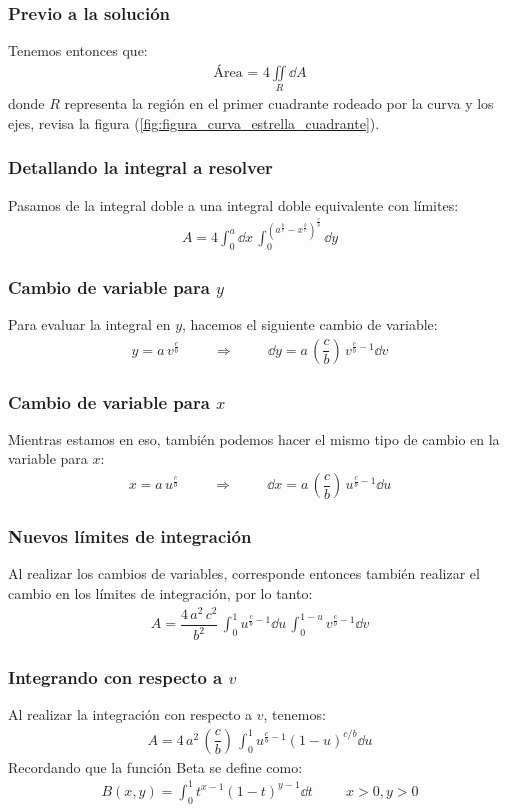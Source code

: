 \begin{frame}
\frametitle{Previo a la solución}
Tenemos entonces que:
\begin{align*}
\mbox{Área = } 4 \iint \limits_{R} \dd{A}
\end{align*}
donde $R$ representa la región en el primer cuadrante rodeado por la curva y los ejes, revisa la figura (\ref{fig:figura_curva_estrella_cuadrante}).
\end{frame}
\begin{frame}
\frametitle{Detallando la integral a resolver}
Pasamos de la integral doble a una integral doble equivalente con límites:
\begin{align*}
A = 4 \int_{0}^{a} \dd{x} \, \int_{0}^{\left( a^{\frac{b}{c}} - x^{\frac{b}{c}} \right)^{\frac{c}{b}}} \dd{y}
\end{align*}
\end{frame}
\begin{frame}
\frametitle{Cambio de variable para $y$}
Para evaluar la integral en $y$, hacemos el siguiente cambio de variable:
\begin{align*}
y = a \, v^{\frac{c}{b}} \hspace{1cm} \Longrightarrow \hspace{1cm} \dd{y} = a \, \left( \dfrac{c}{b} \right) \, v^{\frac{c}{b} - 1} \dd{v}
\end{align*}
\end{frame}
\begin{frame}
\frametitle{Cambio de variable para $x$}
Mientras estamos en eso, también podemos hacer el mismo tipo de cambio en la variable para $x$:
\begin{align*}
x = a \, u^{\frac{c}{b}} \hspace{1cm} \Longrightarrow \hspace{1cm} \dd{x} = a \, \left( \dfrac{c}{b} \right) \, u^{\frac{c}{b} - 1} \dd{u}
\end{align*}
\end{frame}
\begin{frame}
\frametitle{Nuevos límites de integración}
Al realizar los cambios de variables, corresponde entonces también realizar el cambio en los límites de integración, por lo tanto:
\begin{align*}
A = \dfrac{4 \, a^{2} \, c^{2}}{b^{2}} \, \int_{0}^{1} u^{\frac{c}{b} - 1} \dd{u} \, \int_{0}^{1-u} v^{\frac{c}{b} - 1} \dd{v}
\end{align*}
\end{frame}
\begin{frame}
\frametitle{Integrando con respecto a $v$}
Al realizar la integración con respecto a $v$, tenemos:
\begin{align*}
A = 4 \, a^{2} \, \left( \dfrac{c}{b} \right) \, \int_{0}^{1} u^{\frac{c}{b} - 1} (1 - u)^{c/b} \dd{u}
\end{align*}
\pause
Recordando que la función Beta se define como:
\begin{align*}
B(x, y) = \int_{0}^{1} t^{x-1} (1 - t)^{y-1} \dd{t} \hspace{1cm} x > 0, y > 0
\end{align*}
\end{frame}
